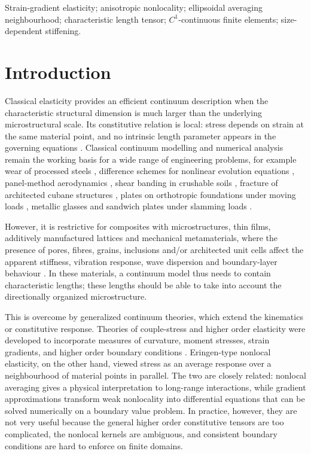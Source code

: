 \documentclass[final,3p,times,fleqn]{elsarticle}
\newcommand{\revtwo}[1]{\textcolor{revtwocolor}{#1}}
\begin{document}
\begin{frontmatter}
\begin{keyword}
Strain-gradient elasticity; anisotropic nonlocality; ellipsoidal averaging neighbourhood; characteristic length tensor; \(C^1\)-continuous finite elements; size-dependent stiffening.
\end{keyword}

\end{frontmatter}

\section{Introduction}
Classical elasticity provides an efficient continuum description when the characteristic structural dimension is much larger than the underlying microstructural scale. Its constitutive relation is local: stress depends on strain at the same material point, and no intrinsic length parameter appears in the governing equations \cite{Love1927}. \revtwo{Classical continuum modelling and numerical analysis remain the working basis for a wide range of engineering problems, for example wear of processed steels \cite{Yan2022Tribo}, difference schemes for nonlinear evolution equations \cite{Dong2024EJDE}, panel-method aerodynamics \cite{Xie2025AST}, shear banding in crushable soils \cite{Bai2026JRMGE}, fracture of architected cubane structures \cite{He2026EFM}, plates on orthotropic foundations under moving loads \cite{Zhang2026PLoSOne}, metallic glasses \cite{Ding2026RareMetals} and sandwich plates under slamming loads \cite{Guo2026TWS}.}


However, it is restrictive for composites with microstructures, thin films, additively manufactured lattices and mechanical metamaterials, where the presence of pores, fibres, grains, inclusions and/or architected unit cells affect the apparent stiffness, vibration response, wave dispersion and boundary-layer behaviour \cite{Jiao2023,Sarar2024}. In these materials, a continuum model thus needs to contain characteristic lengths; these lengths should be able to take into account the directionally organized microstructure.


This is overcome by generalized continuum theories, which extend the kinematics or constitutive response. Theories of couple-stress and higher order elasticity were developed to incorporate measures of curvature, moment stresses, strain gradients, and higher order boundary conditions \cite{Toupin1962,MindlinTiersten1962,Mindlin1964,Mindlin1965}. Eringen-type nonlocal elasticity, on the other hand, viewed stress as an average response over a neighbourhood of material points \cite{EringenEdelen1972,Eringen1972Polar,Eringen1983} in parallel. The two are closely related: nonlocal averaging gives a physical interpretation to long-range interactions, while gradient approximations transform weak nonlocality into differential equations that can be solved numerically on a boundary value problem. In practice, however, they are not very useful because the general higher order constitutive tensors are too complicated, the nonlocal kernels are ambiguous, and consistent boundary conditions are hard to enforce on finite domains.
\end{document}
